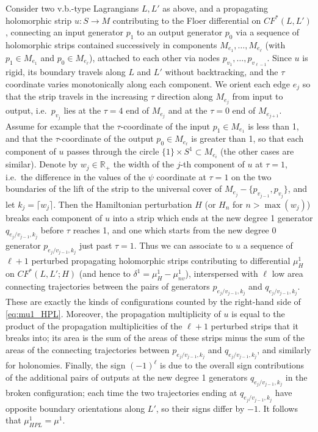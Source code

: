 \documentclass[11pt,leqno]{amsart}
\numberwithin{equation}{section}
\def\R{\mathbb{R}}
\begin{document}
Consider two v.b.-type Lagrangians $L,L'$ as above, and a propagating
holomorphic strip $u:S\to M$ contributing to the Floer differential on
$CF^*(L,L')$, connecting an input generator $p_1$ to an output generator
$p_0$ via a sequence of holomorphic strips contained successively in components
$M_{e_1},\dots,M_{e_\ell}$ (with $p_1\in M_{e_1}$ and $p_0\in M_{e_\ell}$), 
attached to each other via nodes $p_{v_1},\dots,p_{v_{\ell-1}}$. 
Since $u$ is rigid, its boundary travels along $L$ and $L'$ without
backtracking, and the $\tau$ coordinate varies monotonically along each
component. We orient each edge $e_j$ so that the strip travels in the increasing
$\tau$ direction along $M_{e_j}$ from input to output, i.e.\ $p_{v_j}$ lies at the $\tau=4$
end of $M_{e_j}$ and at the $\tau=0$ end of $M_{e_{j+1}}$.  Assume for
example that the $\tau$-coordinate of the input $p_1\in M_{e_1}$ is less than
1, and that the $\tau$-coordinate of the output $p_0\in M_{e_\ell}$ is
greater than 1, so that each component of $u$ passes through the circle
$\{1\}\times S^1\subset M_{e_i}$ (the other cases are similar). Denote by
$w_j\in \R_+$ the width of the $j$-th component of $u$ at $\tau=1$, i.e.\ the
difference in the values of the $\psi$ coordinate at $\tau=1$ on the two
boundaries of the lift of the strip to the universal cover of
$M_{e_j}-\{p_{v_{j-1}},p_{v_j}\}$, and let $k_j=\lceil w_j \rceil$. Then the Hamiltonian perturbation $H$ (or
$H_n$ for $n>\max(w_j)$) breaks each component of $u$ into a strip which
ends at the new degree 1 generator $q_{e_j/v_{j-1},k_j}$ before $\tau$
reaches 1, and one which starts from the new degree 0 generator
$p_{e_j/v_{j-1},k_j}$ just past $\tau=1$. Thus we can associate to $u$ a
sequence of $\ell+1$ perturbed propagating holomorphic strips contributing to
differential $\mu^1_H$ on $CF^*(L,L';H)$ (and hence to
$\delta^1=\mu^1_H-\mu^1_{nv}$), interspersed with $\ell$ low area
connecting trajectories between the pairs of generators $p_{e_j/v_{j-1},k_j}$
and $q_{e_j/v_{j-1},k_j}$. These are exactly the kinds of configurations
counted by the right-hand side of \eqref{eq:mu1_HPL}. Moreover, the
propagation multiplicity of $u$ is equal to the product of the propagation
multiplicities of the $\ell+1$ perturbed strips that it breaks into; its
area is the sum of the areas of these strips minus the sum of the areas of
the connecting trajectories between $p_{e_j/v_{j-1},k_j}$ and
$q_{e_j/v_{j-1},k_j}$, and similarly for holonomies. Finally, the sign
$(-1)^\ell$ is due to the overall sign contributions of the additional pairs of outputs at 
the new degree 1 generators $q_{e_j/v_{j-1},k_j}$ in the broken
configuration; each time the two trajectories
ending at $q_{e_j/v_{j-1},k_j}$ have opposite boundary orientations along
$L'$, so their signs differ by $-1$. It follows that $\mu^1_{HPL}=\mu^1$.
\end{document}
